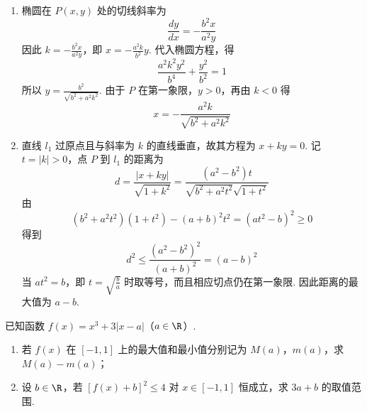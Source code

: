 \begin{solution}
\begin{enumerate}
\item
椭圆在 \(P(x,y)\) 处的切线斜率为
\[
\frac{dy}{dx}=-\frac{b^2x}{a^2y}
\]
因此 \(k=-\frac{b^2x}{a^2y}\)，即 \(x=-\frac{a^2k}{b^2}y\). 代入椭圆方程，得
\[
\frac{a^2k^2y^2}{b^4}+\frac{y^2}{b^2}=1
\]
所以 \(y=\frac{b^2}{\sqrt{b^2+a^2k^2}}\). 由于 \(P\) 在第一象限，\(y>0\)，再由 \(k<0\) 得
\[
x=-\frac{a^2k}{\sqrt{b^2+a^2k^2}}
\]

\item
直线 \(l_1\) 过原点且与斜率为 \(k\) 的直线垂直，故其方程为 \(x+ky=0\). 记 \(t=|k|>0\)，点 \(P\) 到 \(l_1\) 的距离为
\[
d=\frac{|x+ky|}{\sqrt{1+k^2}}
=\frac{(a^2-b^2)t}{\sqrt{b^2+a^2t^2}\sqrt{1+t^2}}
\]
由
\[
(b^2+a^2t^2)(1+t^2)-(a+b)^2t^2=(at^2-b)^2\geqslant0
\]
得到
\[
d^2\leqslant\frac{(a^2-b^2)^2}{(a+b)^2}=(a-b)^2
\]
当 \(at^2=b\)，即 \(t=\sqrt{\frac ba}\) 时取等号，而且相应切点仍在第一象限. 因此距离的最大值为 \(a-b\).
\end{enumerate}
\end{solution}

\begin{problem}
已知函数 \( f(x) = x^3 + 3|x - a| \)（\(a \in \R\)）.

\begin{enumerate}
\item 若 \( f(x) \) 在 \([-1, 1]\) 上的最大值和最小值分别记为 \(M(a)\)，\(m(a)\)，求 \( M(a) - m(a) \)；
\item 设 \( b \in \R \)，若 \(\left[f(x) + b\right]^2 \leqslant 4\) 对 \( x \in [-1, 1]\) 恒成立，求 \( 3a + b \) 的取值范围.
\end{enumerate}
\end{problem}

